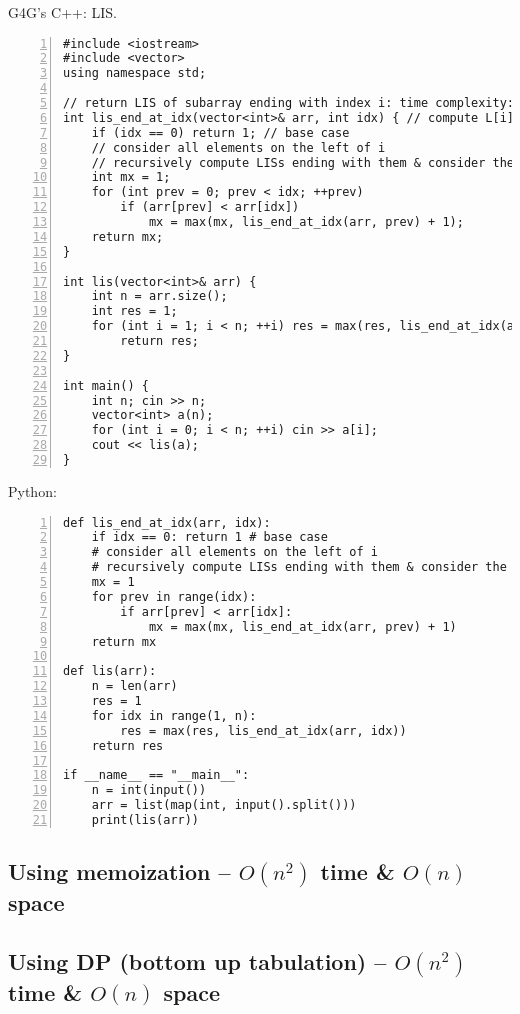 \documentclass{article}
\begin{document}
G4G's C++: LIS.
\begin{Verbatim}[numbers=left,xleftmargin=5mm]
#include <iostream>
#include <vector>
using namespace std;

// return LIS of subarray ending with index i: time complexity: exponential & space complexity: linear
int lis_end_at_idx(vector<int>& arr, int idx) { // compute L[i]
    if (idx == 0) return 1; // base case
    // consider all elements on the left of i
    // recursively compute LISs ending with them & consider the largest
    int mx = 1;
    for (int prev = 0; prev < idx; ++prev)
        if (arr[prev] < arr[idx])
            mx = max(mx, lis_end_at_idx(arr, prev) + 1);
    return mx;
}

int lis(vector<int>& arr) {
    int n = arr.size();
    int res = 1;
    for (int i = 1; i < n; ++i) res = max(res, lis_end_at_idx(arr, i));
        return res;
}

int main() {
    int n; cin >> n;
    vector<int> a(n);
    for (int i = 0; i < n; ++i) cin >> a[i];
    cout << lis(a);
}
\end{Verbatim}
Python:
\begin{Verbatim}[numbers=left,xleftmargin=5mm]
def lis_end_at_idx(arr, idx):
    if idx == 0: return 1 # base case
    # consider all elements on the left of i
    # recursively compute LISs ending with them & consider the largest
    mx = 1
    for prev in range(idx):
        if arr[prev] < arr[idx]:
            mx = max(mx, lis_end_at_idx(arr, prev) + 1)
    return mx

def lis(arr):
    n = len(arr)
    res = 1
    for idx in range(1, n):
        res = max(res, lis_end_at_idx(arr, idx))
    return res

if __name__ == "__main__":
    n = int(input())
    arr = list(map(int, input().split()))
    print(lis(arr))
\end{Verbatim}


\subsection{Using memoization -- $O(n^2)$ time \& $O(n)$ space}


\subsection{Using DP (bottom up tabulation) -- $O(n^2)$ time \& $O(n)$ space}
\end{document}
